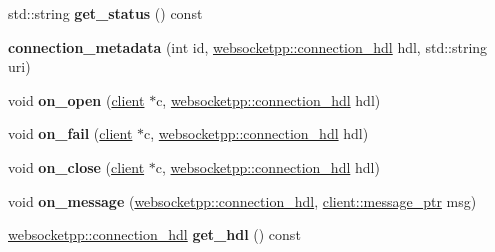 \begin{DoxyCompactItemize}
std\+::string {\bfseries get\+\_\+status} () const
\item 
\mbox{\label{classconnection__metadata_ab73db2e336676ec4efa4d4dc5051958f}} 
{\bfseries connection\+\_\+metadata} (int id, \mbox{\hyperlink{namespacewebsocketpp_a6b3d26a10ee7229b84b776786332631d}{websocketpp\+::connection\+\_\+hdl}} hdl, std\+::string uri)
\item 
\mbox{\label{classconnection__metadata_ab10d997bd75d9e98b235b7e97b84b85a}} 
void {\bfseries on\+\_\+open} (\mbox{\hyperlink{classwebsocketpp_1_1client}{client}} $\ast$c, \mbox{\hyperlink{namespacewebsocketpp_a6b3d26a10ee7229b84b776786332631d}{websocketpp\+::connection\+\_\+hdl}} hdl)
\item 
\mbox{\label{classconnection__metadata_a1c2e652001b8306207beafe17b1a52ed}} 
void {\bfseries on\+\_\+fail} (\mbox{\hyperlink{classwebsocketpp_1_1client}{client}} $\ast$c, \mbox{\hyperlink{namespacewebsocketpp_a6b3d26a10ee7229b84b776786332631d}{websocketpp\+::connection\+\_\+hdl}} hdl)
\item 
\mbox{\label{classconnection__metadata_ac297cf7710d8d510ef383b7395222ce5}} 
void {\bfseries on\+\_\+close} (\mbox{\hyperlink{classwebsocketpp_1_1client}{client}} $\ast$c, \mbox{\hyperlink{namespacewebsocketpp_a6b3d26a10ee7229b84b776786332631d}{websocketpp\+::connection\+\_\+hdl}} hdl)
\item 
\mbox{\label{classconnection__metadata_a78708ddd026fc4fbff883477c0ed01bf}} 
void {\bfseries on\+\_\+message} (\mbox{\hyperlink{namespacewebsocketpp_a6b3d26a10ee7229b84b776786332631d}{websocketpp\+::connection\+\_\+hdl}}, \mbox{\hyperlink{classwebsocketpp_1_1endpoint_a585ecbbfd9689d4e4229e4c8378bd672}{client\+::message\+\_\+ptr}} msg)
\item 
\mbox{\label{classconnection__metadata_a76a6a10e9192cd0ca03e2a2539cf4549}} 
\mbox{\hyperlink{namespacewebsocketpp_a6b3d26a10ee7229b84b776786332631d}{websocketpp\+::connection\+\_\+hdl}} {\bfseries get\+\_\+hdl} () const
\item 
\mbox{\label{classconnection__metadata_a3f71fbb092ec54e496464e42d960a22d}} 

\end{DoxyCompactItemize}
